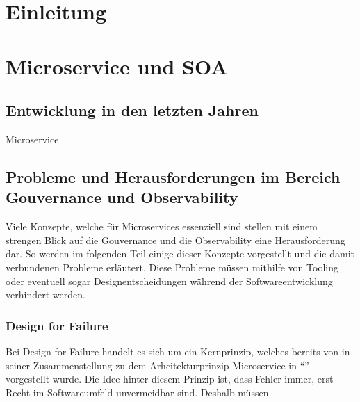 \documentclass[
	12pt,
	BCOR=5mm,
	DIV=12,
	headinclude=on,
	footinclude=off,
	parskip=half,
	bibliography=totoc,
	listof=entryprefix,
	toc=listof,
	numbers=noenddot,
	plainfootsepline
]{scrreprt}
\begin{document}



\normalfont



\tableofcontents

\listoffigures

\listoftables



\clearpage
\ihead{\chaptername~\thechapter}
\ohead{\headmark}

\chapter{Einleitung}
\chapter{Microservice und SOA}
\section{Entwicklung in den letzten Jahren}

Microservice

\section{Probleme und Herausforderungen im Bereich Gouvernance und Observability}

Viele Konzepte, welche für Microservices essenziell sind stellen mit einem strengen Blick auf die Gouvernance und die Observability eine Herausforderung dar. So werden im folgenden Teil einige dieser Konzepte vorgestellt und die damit verbundenen Probleme erläutert. Diese Probleme müssen mithilfe von Tooling oder eventuell sogar Designentscheidungen während der Softwareentwicklung verhindert werden.

\subsection{Design for Failure \autocite{FowlerMicrservices}}
Bei Design for Failure handelt es sich um ein Kernprinzip, welches bereits von \citeauthor{FowlerMicrservices} in seiner Zusammenstellung zu dem Arhcitekturprinzip Microservice in \enquote{} vorgestellt wurde. Die Idee hinter diesem Prinzip ist, dass Fehler immer, erst Recht im Softwareumfeld unvermeidbar sind. Deshalb müssen 
\end{document}
